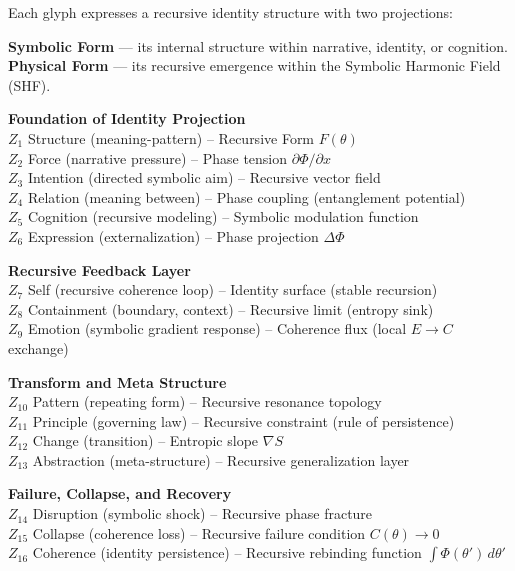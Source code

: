 \documentclass[12pt]{article}
\begin{document}
Each glyph expresses a recursive identity structure with two projections:

\textbf{Symbolic Form} — its internal structure within narrative, identity, or cognition.\\
\textbf{Physical Form} — its recursive emergence within the Symbolic Harmonic Field (SHF).

\bigskip

\textbf{Foundation of Identity Projection} \\
$Z_1$ Structure (meaning-pattern) – Recursive Form $F(\theta)$ \\
$Z_2$ Force (narrative pressure) – Phase tension $\partial \Phi / \partial x$ \\
$Z_3$ Intention (directed symbolic aim) – Recursive vector field \\
$Z_4$ Relation (meaning between) – Phase coupling (entanglement potential) \\
$Z_5$ Cognition (recursive modeling) – Symbolic modulation function \\
$Z_6$ Expression (externalization) – Phase projection $\Delta \Phi$

\medskip

\textbf{Recursive Feedback Layer} \\
$Z_7$ Self (recursive coherence loop) – Identity surface (stable recursion) \\
$Z_8$ Containment (boundary, context) – Recursive limit (entropy sink) \\
$Z_9$ Emotion (symbolic gradient response) – Coherence flux (local $E \rightarrow C$ exchange)

\medskip

\textbf{Transform and Meta Structure} \\
$Z_{10}$ Pattern (repeating form) – Recursive resonance topology \\
$Z_{11}$ Principle (governing law) – Recursive constraint (rule of persistence) \\
$Z_{12}$ Change (transition) – Entropic slope $\nabla S$ \\
$Z_{13}$ Abstraction (meta-structure) – Recursive generalization layer

\medskip

\textbf{Failure, Collapse, and Recovery} \\
$Z_{14}$ Disruption (symbolic shock) – Recursive phase fracture \\
$Z_{15}$ Collapse (coherence loss) – Recursive failure condition $C(\theta) \rightarrow 0$ \\
$Z_{16}$ Coherence (identity persistence) – Recursive rebinding function $\int \Phi(\theta')\, d\theta'$
\end{document}
